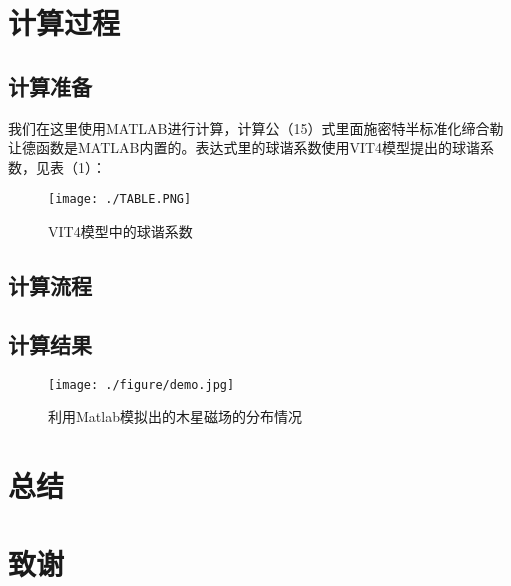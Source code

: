 \documentclass{article}
\begin{document}
\section{计算过程}


\subsection{计算准备}
  我们在这里使用MATLAB进行计算，计算公（15）式里面施密特半标准化缔合勒让德函数是MATLAB内置的。表达式里的球谐系数使用VIT4模型提出的球谐系数，见表（1）：

\begin{figure}
    \centering
    \texttt{[image: ./TABLE.PNG]}  
    \caption{VIT4模型中的球谐系数}
    \label{fig:my_label}
\end{figure}



\subsection{计算流程}


\subsection{计算结果}



\begin{figure}
    \centering
    \texttt{[image: ./figure/demo.jpg]}
    \caption{利用Matlab模拟出的木星磁场的分布情况}
    \label{fig:my_label}
\end{figure}



\section{总结}



\section{致谢}
\end{document}
